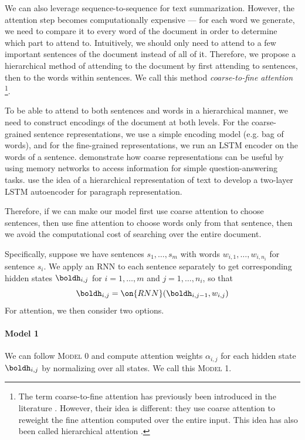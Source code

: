 \documentclass[12pt]{report}
\begin{document}
We can also leverage sequence-to-sequence for text summarization. However, the attention step becomes computationally expensive --- for each word we generate, we need to compare it to every word of the document in order to determine which part to attend to. Intuitively, we should only need to attend to a few important sentences of the document instead of all of it. Therefore, we propose a hierarchical method of attending to the document by first attending to sentences, then to the words within sentences. We call this method \emph{coarse-to-fine attention}
\footnote{The term coarse-to-fine attention has previously been introduced in the literature \citep{mei2016}. However, their idea is different: they use coarse attention to reweight the fine attention computed over the entire input. This idea has also been called hierarchical attention \citep{nallapati2016seq2seq}.}.



To be able to attend to both sentences and words in a hierarchical manner, we need to construct encodings of the document at both levels. For the coarse-grained sentence representations, we use a simple encoding model (e.g. bag of words), and for the fine-grained representations, we run an LSTM encoder on the words of a sentence.
\citet{Sukhbaatar2015} demonstrate how coarse representations can be useful by using memory networks to access information for simple question-answering tasks.
\citet{li2015autoencoder} use the idea of a hierarchical representation of text to develop a two-layer LSTM autoencoder for paragraph representation.

Therefore, if we can make our model first use coarse attention to choose sentences, then use fine attention to choose words only from that sentence, then we avoid the computational cost of searching over the entire document.

Specifically, suppose we have sentences $s_1, \ldots, s_m$ with words $w_{i,1}, \ldots, w_{i,n_i}$ for sentence $s_i$. We apply an RNN to each sentence separately to get corresponding hidden states $\boldh_{i,j}$ for $i = 1, \ldots, m$ and $j = 1, \ldots, n_i$, so that
\begin{equation}
\boldh_{i,j} = \on{RNN}(\boldh_{i,j-1}, w_{i,j})
\end{equation}
For attention, we then consider two options.

\paragraph{Model 1} We can follow \textsc{Model 0} and compute attention weights $\alpha_{i,j}$ for each hidden state $\boldh_{i,j}$ by normalizing over all states. We call this \textsc{Model 1}.
\end{document}
